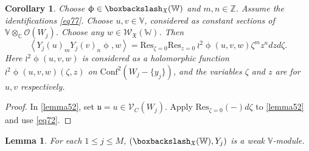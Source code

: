 \documentclass[11pt,b5paper,notitlepage]{article}
\theoremstyle{definition}
\theoremstyle{plain}
\newtheorem{co}[df]{Corollary}
\newtheorem{lm}[df]{Lemma}
\newcommand{\fk}{\mathfrak}
\newcommand{\mc}{\mathcal}
\newcommand{\Conf}{\mathrm{Conf}}
\newcommand{\Res}{\mathrm{Res}}
\newcommand{\scr}{\mathscr}
\newcommand{\Vbb}{\mathbb V}
\newcommand{\Wbb}{\mathbb W}
\newcommand{\Cbb}{\mathbb C}
\newcommand{\Zbb}{\mathbb Z}
\newcommand{\<}{\left\langle}
\renewcommand{\>}{\right\rangle}
\newcommand{\fx}{\mathfrak{X}}
\numberwithin{equation}{section}
\begin{document}
\begin{co}\label{lb22}
Choose $\upphi\in \boxbackslash_{\fx}(\Wbb)$ and $m,n\in \Zbb$. Assume the identifications \eqref{eq77}. Choose $u,v\in \Vbb$, considered as constant sections of $\Vbb\otimes_\Cbb\mc O(W_j)$. Choose any $w\in \scr W_{\fk X}(\Wbb)$. Then
    \begin{equation}\label{lemma51}
        \<Y_j(u)_mY_j(v)_n\upphi,w\>=\Res_{\zeta=0}\Res_{z=0}~{\wr^2\upphi}(u,v,w)\zeta^mz^n dzd\zeta.
    \end{equation}
    Here $\wr^2\upphi(u,v,w)$ is considered as a holomorphic function $\wr^2\upphi(u,v,w)(\zeta,z)$ on $\Conf^2(W_j-\{y_j\})$, and the variables $\zeta$ and $z$ are for $u,v$ respectively.
\end{co}


\begin{proof}
In \eqref{lemma52}, set $\fk u=u\in\scr V_C(W_j)$. Apply $\Res_{\zeta=0}(-)d\zeta$ to \eqref{lemma52} and use \eqref{eq72}.
\end{proof}


\begin{lm}\label{lb21}
For each $1\leq j\leq M$,    $(\boxbackslash_{\fx}(\Wbb),Y_j)$ is a weak $\Vbb$-module.
\end{lm}
\end{document}
